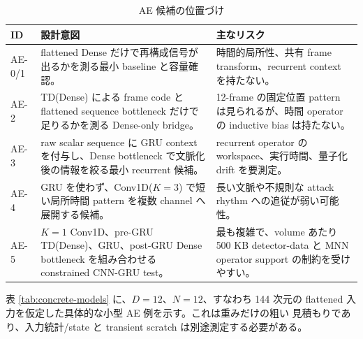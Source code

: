 \begin{table}[tb]
  \centering
  \caption{AE 候補の位置づけ}
  \label{tab:model-candidates}
  \begin{tabularx}{\linewidth}{lY Y}
    \toprule
    ID & 設計意図 & 主なリスク \\
    \midrule
    AE-0/1 &
    flattened Dense だけで再構成信号が出るかを測る最小 baseline と容量確認。 &
    時間的局所性、共有 frame transform、recurrent context を持たない。 \\
    AE-2 &
    TD(Dense) による frame code と flattened sequence bottleneck だけで足りるかを測る Dense-only bridge。 &
    12-frame の固定位置 pattern は見られるが、時間 operator の inductive bias は持たない。 \\
    AE-3 &
    raw scalar sequence に GRU context を付与し、Dense bottleneck で文脈化後の情報を絞る最小 recurrent 候補。 &
    recurrent operator の workspace、実行時間、量子化 drift を要測定。 \\
    AE-4 &
    GRU を使わず、Conv1D($K=3$) で短い局所時間 pattern を複数 channel へ展開する候補。 &
    長い文脈や不規則な attack rhythm への追従が弱い可能性。 \\
    AE-5 &
    $K=1$ Conv1D、pre-GRU TD(Dense)、GRU、post-GRU Dense bottleneck を組み合わせる constrained CNN-GRU test。 &
    最も複雑で、volume あたり 500 KB detector-data と MNN operator support の制約を受けやすい。 \\
    \bottomrule
  \end{tabularx}
\end{table}

表 \ref{tab:concrete-models} に、$D=12$、$N=12$、すなわち 144 次元の
flattened 入力を仮定した具体的な小型 AE 例を示す。これは重みだけの粗い
見積もりであり、入力統計/state と transient scratch は別途測定する必要がある。

\begin{table}[tb]
  \centering
  \caption{メモリ制約を考慮した具体 AE 例}
  \label{tab:concrete-models}
  \small
\end{table}

